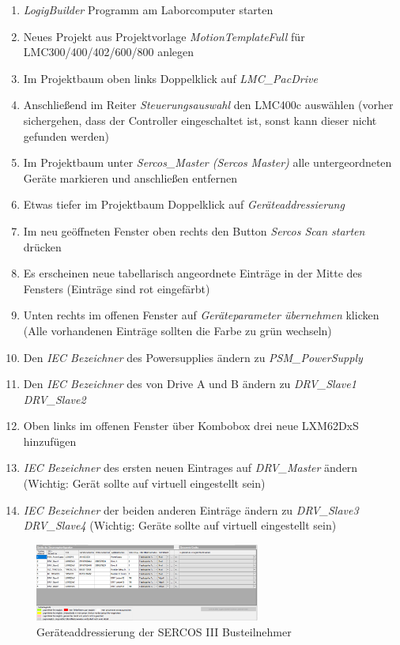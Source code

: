 \documentclass[../../../Bachelorarbeit.tex]{subfiles}
\begin{document}
\begin{enumerate}
    \item \textit{LogigBuilder} Programm am Laborcomputer starten
    \item Neues Projekt aus Projektvorlage \textit{MotionTemplateFull} für LMC300/400/402/600/800 anlegen
    \item Im Projektbaum oben links Doppelklick auf \textit{LMC\_PacDrive}
    \item Anschließend im Reiter \textit{Steuerungsauswahl} den LMC400c auswählen (vorher sichergehen, dass der Controller eingeschaltet ist, sonst kann dieser nicht gefunden werden)
    \item Im Projektbaum unter \textit{Sercos\_Master (Sercos Master)} alle untergeordneten Geräte markieren und anschließen entfernen
    \item Etwas tiefer im Projektbaum Doppelklick auf \textit{Geräteaddressierung}
    \item Im neu geöffneten Fenster oben rechts den Button \textit{Sercos Scan starten} drücken
    \item Es erscheinen neue tabellarisch angeordnete Einträge in der Mitte des Fensters (Einträge sind rot eingefärbt)
    \item Unten rechts im offenen Fenster auf \textit{Geräteparameter übernehmen} klicken (Alle vorhandenen Einträge sollten die Farbe zu grün wechseln)
    \item Den \textit{IEC Bezeichner} des Powersupplies ändern zu \textit{PSM\_PowerSupply}
    \item Den \textit{IEC Bezeichner} des von Drive A und B ändern zu \textit{DRV\_Slave1} \bzw \\ \textit{DRV\_Slave2}
    \item Oben links im offenen Fenster über Kombobox drei neue LXM62DxS hinzufügen
    \item \textit{IEC Bezeichner} des ersten neuen Eintrages auf \textit{DRV\_Master} ändern (Wichtig: Gerät sollte auf virtuell eingestellt sein)
    \item \textit{IEC Bezeichner} der beiden anderen Einträge ändern zu \textit{DRV\_Slave3} \bzw \\ \textit{DRV\_Slave4} (Wichtig: Geräte sollte auf virtuell eingestellt sein)
\end{enumerate}

\begin{figure}[H]
    \centering
    \includegraphics[width=0.66\textwidth]{Images/Sercos.png}
    \caption[Geräteaddressierung]{Geräteaddressierung der SERCOS III Busteilnehmer}
    \label{fig:my-img24}
\end{figure}
\end{document}
